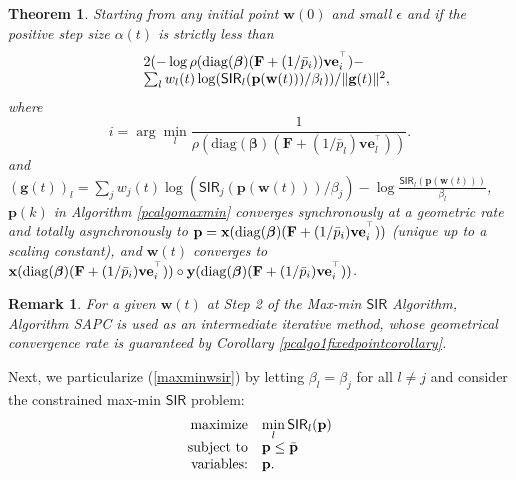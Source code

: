 \documentclass[10pt,twocolumn]{IEEEtran}
\newcommand{\0}{\mathbf{0}}
\newcommand{\1}{\mathbf{1}}
\def\diag{\mathop{{\rm diag}}\nolimits}
\newcommand{\trans}{^\top}
\newtheorem{theorem}{Theorem}
\newtheorem{remark}{Remark}
\begin{document}
\begin{theorem}
\label{maxminSIRcorollary}
Starting from any initial point $\mathbf{w}(0)$ and small $\epsilon$ and if the positive step size $\alpha(t)$ is strictly less than
\begin{equation}
\begin{array}{cl}
& 2(-\log \rho(\diag(\boldsymbol{\beta})(\mathbf{F}+(1/\bar{p}_i))\mathbf{v}\mathbf{e}_i^{\trans})- \nonumber \\
& \sum_l w_l(t)\log (\mathsf{SIR}_l(\mathbf{p}(\mathbf{w}(t)))/\beta_l) )/\Vert \mathbf{g}(t) \Vert^2,
\end{array}
\end{equation}
where
\begin{equation}
\label{maxminwsiri}
i = \arg \displaystyle \min_l \frac{1}{\rho(\mbox{diag}(\boldsymbol{\beta})(\mathbf{F}+(1/\bar{p}_l)\mathbf{v}\mathbf{e}_l^{\trans}))}.
\end{equation}
and $(\mathbf{g}(t))_l =\sum_j w_j(t) \log (\mathsf{SIR}_j (\mathbf{p}(\mathbf{w}(t)))/\beta_j) - \log \frac{\mathsf{SIR}_l (\mathbf{p}(\mathbf{w}(t)))}{\beta_l}$, $\mathbf{p}(k)$ in Algorithm \ref{pcalgomaxmin} converges synchronously at a geometric rate and totally asynchronously to $\mathbf{p}=\mathbf{x}(\diag(\boldsymbol{\beta})(\mathbf{F}+(1/\bar{p}_i)\mathbf{v}\mathbf{e}_i^{\trans}))$ (unique up to a scaling constant), and $\mathbf{w}(t)$ converges to $\mathbf{x}(\diag(\boldsymbol{\beta})(\mathbf{F}+(1/\bar{p}_i)\mathbf{v}\mathbf{e}_i^{\trans})) \circ \mathbf{y}(\diag(\boldsymbol{\beta})(\mathbf{F}+(1/\bar{p}_i)\mathbf{v}\mathbf{e}_i^{\trans}))$.
\end{theorem}

\begin{remark}
For a given $\mathbf{w}(t)$ at Step 2 of the Max-min $\mathsf{SIR}$ Algorithm, Algorithm SAPC is used as an intermediate iterative method, whose geometrical convergence rate is guaranteed by Corollary \ref{pcalgo1fixedpointcorollary}. 
\end{remark}

Next, we particularize (\ref{maxminwsir}) by letting $\beta_l=\beta_j$ for all $l \ne j$ and consider the constrained max-min $\mathsf{SIR}$ problem:
\begin{equation}
\label{maxminsirgeneral1}
\begin{array}
[c]{rl}
\mbox{maximize} & \displaystyle \min_l \mathsf{SIR}_l(\mathbf{p}) \\
\mbox{subject to} & \mathbf{p} \le \bar{\mathbf{p}} \\
\mbox{variables:} & \mathbf{p}.
\end{array}
\end{equation}
\end{document}
